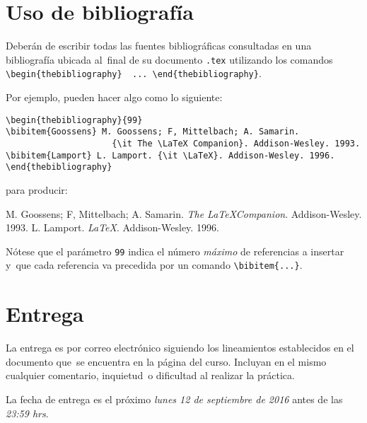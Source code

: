\documentclass[paper=letter, fontsize=12pt]{scrartcl}
\begin{document}
\section*{Uso de bibliografía}
Deberán de escribir todas las fuentes bibliográficas consultadas en una bibliografía ubicada al\
final de su documento \texttt{.tex} utilizando los comandos\\
\verb+\begin{thebibliography}  ... \end{thebibliography}+.\par
Por ejemplo, pueden hacer algo como lo siguiente:
\begin{verbatim}
\begin{thebibliography}{99}
\bibitem{Goossens} M. Goossens; F, Mittelbach; A. Samarin.
                     {\it The \LaTeX Companion}. Addison-Wesley. 1993.
\bibitem{Lamport} L. Lamport. {\it \LaTeX}. Addison-Wesley. 1996.
\end{thebibliography}
\end{verbatim}
para producir:
\begin{thebibliography}{99}
 M. Goossens; F, Mittelbach; A. Samarin.
  {\it The \LaTeX Companion}. Addison-Wesley. 1993.
 L. Lamport. {\it \LaTeX}. Addison-Wesley. 1996.
\end{thebibliography}\par
Nótese que el parámetro \texttt{99} indica el número \emph{máximo} de referencias a insertar y\
que cada referencia va precedida por un comando \verb+\bibitem{...}+.

\section*{Entrega}

La entrega es por correo electrónico siguiendo los lineamientos establecidos en el documento que\
se encuentra en la página del curso. Incluyan en el mismo cualquier comentario, inquietud\
o dificultad al realizar la práctica.\par
La fecha de entrega es el próximo \emph{lunes 12 de septiembre de 2016} antes de las \emph{23:59 hrs}.
\end{document}
